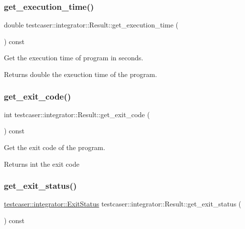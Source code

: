 \subsubsection{\texorpdfstring{get\_execution\_time()}{get\_execution\_time()}}
{\footnotesize\ttfamily double testcaser\+::integrator\+::\+Result\+::get\+\_\+execution\+\_\+time (\begin{DoxyParamCaption}{ }\end{DoxyParamCaption}) const\hspace{0.3cm}{\ttfamily [inline]}}



Get the execution time of program in seconds. 

\begin{DoxyReturn}{Returns}
double the exeuction time of the program. 
\end{DoxyReturn}
\mbox{\label{classtestcaser_1_1integrator_1_1Result_a0795d3307ac8c3186288020bc75b3767}} 
\subsubsection{\texorpdfstring{get\_exit\_code()}{get\_exit\_code()}}
{\footnotesize\ttfamily int testcaser\+::integrator\+::\+Result\+::get\+\_\+exit\+\_\+code (\begin{DoxyParamCaption}{ }\end{DoxyParamCaption}) const\hspace{0.3cm}{\ttfamily [inline]}}



Get the exit code of the program. 

\begin{DoxyReturn}{Returns}
int the exit code 
\end{DoxyReturn}
\mbox{\label{classtestcaser_1_1integrator_1_1Result_aadd7237340243c5506d1fbf23f30e9d5}} 
\subsubsection{\texorpdfstring{get\_exit\_status()}{get\_exit\_status()}}
{\footnotesize\ttfamily \mbox{\hyperlink{namespacetestcaser_1_1integrator_a68fcfdfd3f063954e9fd1a94f4b4f755}{testcaser\+::integrator\+::\+Exit\+Status}} testcaser\+::integrator\+::\+Result\+::get\+\_\+exit\+\_\+status (\begin{DoxyParamCaption}{ }\end{DoxyParamCaption}) const\hspace{0.3cm}{\ttfamily [inline]}}



